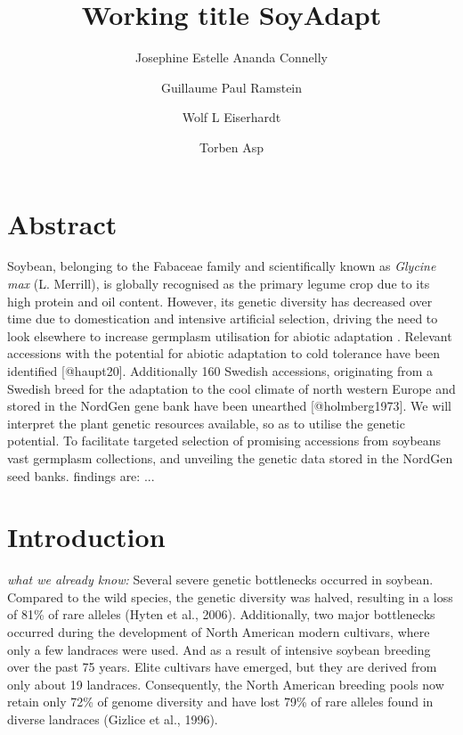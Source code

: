\documentclass[9pt, onecolumn,twoside]{gsajnl}
\title{Working title SoyAdapt}
\author[1,$\dagger$,$\ast$]{Josephine Estelle Ananda Connelly}
\author[2]{Guillaume Paul Ramstein}
\author[3]{Wolf L Eiserhardt}
\author[4]{Torben Asp}
\affil[1,2,4]{Centre for Quantitative Genetics and Genomics, Faculty of Technical Sciences, Aarhus University (DK).}
\affil[1,3]{Department of Biology, Faculty of Natural Sciences, Aarhus University, (DK).}
\affil[3]{Royal Botanic Gardens, Kew, (UK).}
\begin{document}
\maketitle
\thispagestyle{firststyle}
\vspace{-13pt}%


\section{Abstract}

Soybean, belonging to the Fabaceae family and scientifically known as \textit{Glycine max} (L. Merrill), is globally recognised as the primary legume crop due to its high protein and oil content. However, its genetic diversity has decreased over time due to domestication and intensive artificial selection, driving the need to look elsewhere to increase germplasm utilisation for abiotic adaptation \citep{hyten06, gizlice96}.  Relevant accessions with the potential for abiotic adaptation to cold tolerance have been identified [@haupt20]. Additionally 160 Swedish accessions, originating from a Swedish breed for the adaptation to the cool climate of north western Europe and stored in the NordGen gene bank have been unearthed [@holmberg1973]. We will interpret the plant genetic resources available, so as to utilise the genetic potential. To facilitate targeted selection of promising accessions from soybeans vast germplasm collections,  and unveiling the genetic data stored in the NordGen seed banks. findings are: ... 

\section{Introduction}

\textit{what we already know:} Several severe genetic bottlenecks occurred in soybean. Compared to the wild species, the genetic diversity was halved, resulting in a loss of 81\% of rare alleles (Hyten et al., 2006). Additionally, two major bottlenecks occurred during the development of North American modern cultivars, where only a few landraces were used. And as a result of intensive soybean breeding over the past 75 years. Elite cultivars have emerged, but they are derived from only about 19 landraces. Consequently, the North American breeding pools now retain only 72\% of genome diversity and have lost 79\% of rare alleles found in diverse landraces (Gizlice et al., 1996).
\end{document}
